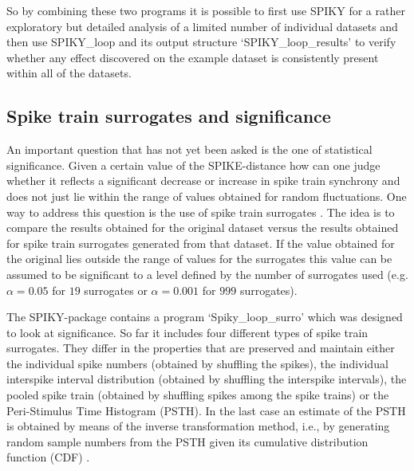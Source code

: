 \documentclass[10pt,twocolumn]{elsart5p}
\begin{document}
So by combining these two programs it is possible to first use SPIKY for a rather exploratory but detailed analysis of a limited number of individual datasets and then use SPIKY\_loop and its output structure `SPIKY\_loop\_results' to verify whether any effect discovered on the example dataset is consistently present within all of the datasets.


\subsection{\label{ss:Spike-train-surrogates} Spike train surrogates and significance}

An important question that has not yet been asked is the one of statistical significance. Given a certain value of the SPIKE-distance how can one judge whether it reflects a significant decrease or increase in spike train synchrony and does not just lie within the range of values obtained for random fluctuations. One way to address this question is the use of spike train surrogates \citep{Kass05, Gruen09, Louis10}. The idea is to compare the results obtained for the original dataset versus the results obtained for spike train surrogates generated from that dataset. If the value obtained for the original lies outside the range of values for the surrogates this value can be assumed to be significant to a level defined by the number of surrogates used (e.g. $\alpha = 0.05$ for $19$ surrogates or $\alpha = 0.001$ for $999$ surrogates).

The SPIKY-package contains a program `Spiky\_loop\_\-surro' which was designed to look at significance. So far it includes four different types of spike train surrogates. They differ in the properties that are preserved and maintain either the individual spike numbers (obtained by shuffling the spikes), the individual interspike interval distribution (obtained by shuffling the interspike intervals), the pooled spike train (obtained by shuffling spikes among the spike trains) or the Peri-Stimulus Time Histogram (PSTH). In the last case an estimate of the PSTH is obtained by means of the inverse transformation method, i.e., by generating random sample numbers from the PSTH given its cumulative distribution function (CDF) \citep{Ross97}.
\end{document}
